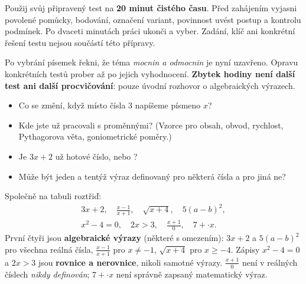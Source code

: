 \documentclass[11pt,a4paper]{article}
\begin{document}

\begin{zadaniBox}[title={Poznámka pro učitele - Organizace testu}]
Použij svůj připravený test na \textbf{20 minut čistého času}.
Před zahájením vyjasni povolené pomůcky, bodování, označení variant,
povinnost uvést postup a kontrolu podmínek.
Po dvaceti minutách práci ukonči a vyber.
Zadání, klíč ani konkrétní řešení testu nejsou součástí této přípravy.
\end{zadaniBox}

Po vybrání písemek řekni, že téma \emph{mocnin a odmocnin} je nyní uzavřeno.
Opravu konkrétních testů prober až po jejich vyhodnocení.
\textbf{Zbytek hodiny není další test ani další procvičování}:
pouze úvodní rozhovor o algebraických výrazech.

\begin{zadaniBox}[title={Samostatná práce 1}]
\begin{itemize}
\item Co se změní, když místo čísla $3$ napíšeme písmeno $x$?
\item Kde jste už pracovali s proměnnými? (Vzorce pro obsah, obvod, rychlost,
Pythagorova věta, goniometrické poměry.)
\item Je $3x+2$ už hotové číslo, nebo ?
\item Může být jeden a tentýž výraz definovaný pro některá čísla a pro jiná ne?
\end{itemize}
\end{zadaniBox}

\begin{zadaniReseniBox}[title={Samostatná práce 2},breakable=false]
Společně na tabuli roztřiď:
\[
\begin{gathered}
3x+2,\quad \frac{x-1}{x+1},\quad \sqrt{x+4},\quad 5(a-b)^2,\\
x^2-4=0,\quad 2x>3,\quad \frac{x+1}{0},\quad 7+\cdot x.
\end{gathered}
\]
\tcblower
První čtyři jsou \textbf{algebraické výrazy} (některé s omezením):
$3x+2$ a $5(a-b)^2$ pro všechna reálná čísla,
$\frac{x-1}{x+1}$ pro $x\ne-1$,
$\sqrt{x+4}$ pro $x\ge-4$.
Zápisy $x^2-4=0$ a $2x>3$ jsou \textbf{rovnice a nerovnice}, nikoli samotné výrazy.
$\frac{x+1}{0}$ není v reálných číslech \emph{nikdy definován};
$7+\cdot x$ není správně zapsaný matematický výraz.
\end{zadaniReseniBox}
\end{document}
